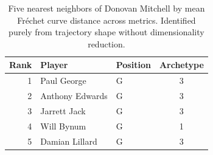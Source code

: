 \begin{table}[htbp]
  \centering\small
  \begin{tabular}{rllc}
    \toprule
    Rank & Player & Position & Archetype \\
    \midrule
    1 & Paul George & G & 3 \\
    2 & Anthony Edwards & G & 3 \\
    3 & Jarrett Jack & G & 3 \\
    4 & Will Bynum & G & 1 \\
    5 & Damian Lillard & G & 3 \\
    \bottomrule
  \end{tabular}
  \caption{Five nearest neighbors of Donovan Mitchell by mean Fr\'{e}chet curve distance across metrics. Identified purely from trajectory shape without dimensionality reduction.}
  \label{tab:Donovan_Mitchell_frechet_curve_neighbors}
\end{table}

